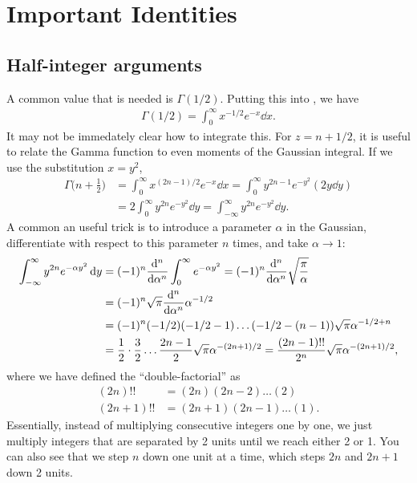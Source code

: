 \section{Important Identities}


\subsection{Half-integer arguments}

A common value that is needed is $\Gamma(1/2)$.
Putting this into , we have
\begin{eqnarray}
    \Gamma(1/2) = \int_{0}^{\infty} x^{-1/2} e^{-x} \dd{x}
.\end{eqnarray}
It may not be immedately clear how to integrate this.
For $z = n + 1/2$, it is useful to relate the Gamma function to even moments of the Gaussian integral.
If we use the substitution $x = y^2$,
\begin{align}
    \Gamma\Big(n + \frac{1}{2} \Big) &= \int_{0}^{\infty} x^{(2n-1)/2} e^{-x} \dd{x} = \int_{0}^{\infty} y^{2n - 1} e^{-y^2} ( 2 y \dd{y} ) \nonumber \\
    \label{eq:gamma-odd-half-int}
                                     &= 2 \int_{0}^{\infty} y^{2n} e^{-y^2} \dd{y} = \int_{-\infty}^{\infty} y^{2n} e^{-y^2} \dd{y}
.\end{align}
A common an useful trick is to introduce a parameter $\alpha$ in the Gaussian, differentiate with respect to this parameter $n$ times, and take $\alpha \rightarrow 1$:
\begin{align}
    \int_{-\infty}^{\infty} y^{2n} e^{-\alpha y^2} \dd{y} &= (-1)^{n} \dv[n]{\alpha} \int_{0}^{\infty} e^{-\alpha y^2} = (-1)^{n} \dv[n]{\alpha} \sqrt{\frac{\pi}{\alpha}} \nonumber \\
                                                          &= (-1)^{n} \sqrt{\pi} \dv[n]{\alpha} \alpha^{-1/2} \nonumber \\
                                                          &= (-1)^{n}(-1/2)(-1/2 - 1)\hdots(-1/2 - (n-1)) \sqrt{\pi} \alpha^{-1/2 + n} \nonumber \\
                                                          &= \frac{1}{2} \cdot \frac{3}{2} \ldots  \frac{2n-1}{2} \sqrt{\pi} \alpha^{-(2n+1)/2} = \frac{(2n-1)!!}{2^{n}} \sqrt{\pi} \alpha^{-(2n+1)/2}
,\end{align}
where we have defined the ``double-factorial'' as
\begin{align}
    (2n)!! &= (2n)(2n-2)\ldots(2) \\
    (2n+1)!! &= (2n+1)(2n-1)\ldots(1)
.\end{align}
Essentially, instead of multiplying consecutive integers one by one, we just multiply integers that are separated by 2 units until we reach either 2 or 1.
You can also see that we step $n$ down one unit at a time, which steps $2n$ and $2n+1$ down 2 units.

